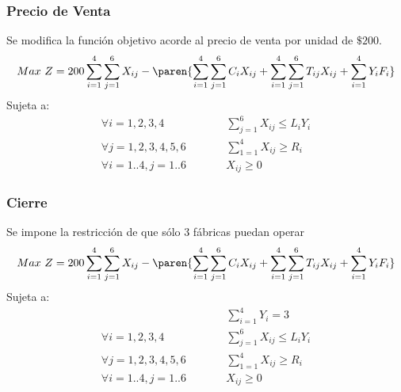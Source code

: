 \begin{homeworkProblem}
\subsubsection{Precio de Venta}
Se modifica la función objetivo acorde al precio de venta por unidad de $\$200$.
\begin{align*}
    Max\ Z = 200\sum_{i=1}^{4}{ \sum_{j=1}^{6}{ X_{ij} } } - \paren{\sum_{i=1}^{4}{\sum_{j=1}^{6}{C_iX_{ij}}}   +
     \sum_{i=1}^{4}{\sum_{j=1}^{6}{T_{ij}X_{ij}}} + \sum_{i=1}^{4}{Y_iF_i}}
\end{align*}
Sujeta a:
\begin{align*}
    &\forall i=1,2,3,4&\quad\quad &\sum_{j=1}^{6}{X_{ij}}\leq L_iY_i& \\
    &\forall j=1,2,3,4,5,6&\quad\quad &\sum_{1=1}^{4}{X_{ij}}\geq R_i& \\
    &\forall i=1..4,j=1..6&\quad\quad &X_{ij}\geq 0&
\end{align*}


\subsubsection{Cierre}
Se impone la restricción de que sólo 3 fábricas puedan operar
\begin{align*}
    Max\ Z = 200\sum_{i=1}^{4}{ \sum_{j=1}^{6}{ X_{ij} } } - \paren{\sum_{i=1}^{4}{\sum_{j=1}^{6}{C_iX_{ij}}}   +
     \sum_{i=1}^{4}{\sum_{j=1}^{6}{T_{ij}X_{ij}}} + \sum_{i=1}^{4}{Y_iF_i}}
\end{align*}
Sujeta a:
\begin{align*}
    && &\sum_{i=1}^{4}{Y_i} = 3\\
    &\forall i=1,2,3,4&\quad\quad &\sum_{j=1}^{6}{X_{ij}}\leq L_iY_i& \\
    &\forall j=1,2,3,4,5,6&\quad\quad &\sum_{1=1}^{4}{X_{ij}}\geq R_i& \\
    &\forall i=1..4,j=1..6&\quad\quad &X_{ij}\geq 0&
\end{align*}

\end{homeworkProblem}


